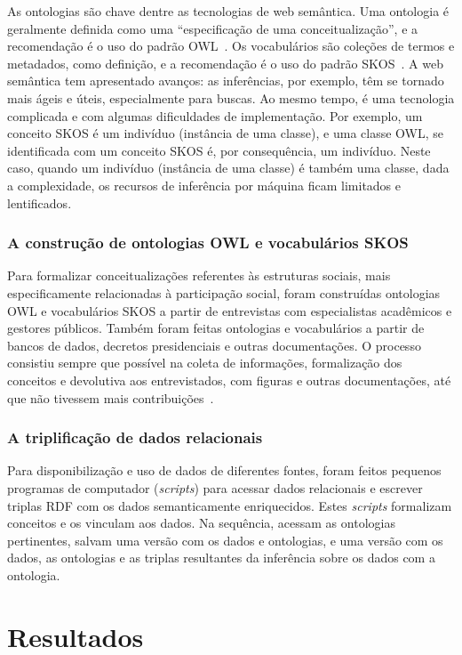 \documentclass[a4paper,openright,12pt]{report} %
\begin{document}
As ontologias são chave dentre as tecnologias de web semântica.
Uma ontologia é geralmente definida como uma ``especificação de
uma conceitualização'', e a recomendação é o uso do padrão OWL~\cite{owl}.
Os vocabulários são coleções de termos e metadados, como definição,
e a recomendação é o uso do padrão SKOS~\cite{skos}.
A web semântica tem apresentado avanços:
as inferências, por exemplo, têm se tornado mais ágeis e úteis, especialmente para buscas.
Ao mesmo tempo, é uma tecnologia
complicada e com algumas dificuldades de implementação.
Por exemplo, um conceito SKOS é um indivíduo (instância de uma classe),
e uma classe OWL,
se identificada com um conceito SKOS é, por consequência, um
indivíduo.
Neste caso, quando um indivíduo (instância de uma classe) é
também uma classe, dada a complexidade, os recursos de inferência por máquina 
ficam limitados e lentificados.

\subsection{A construção de ontologias OWL e vocabulários SKOS}

Para formalizar conceitualizações referentes às estruturas sociais,
mais especificamente relacionadas à participação social,
foram construídas ontologias OWL e vocabulários SKOS a partir de entrevistas
com especialistas acadêmicos e gestores públicos.
Também foram feitas ontologias e vocabulários a partir de bancos de dados,
decretos presidenciais e outras documentações.
O processo  consistiu sempre que possível na coleta de informações,
formalização dos conceitos e devolutiva aos entrevistados,
com figuras e outras documentações, até que não tivessem
mais contribuições~\cite{pnud5}.

\subsection{A triplificação de dados relacionais}
Para disponibilização e uso de dados de diferentes fontes, foram
feitos pequenos programas de computador (\emph{scripts}) para
acessar dados relacionais e escrever triplas RDF com os dados semanticamente enriquecidos.
Estes \emph{scripts} formalizam conceitos e os vinculam aos dados.
Na sequência, acessam as ontologias pertinentes, salvam
uma versão com os dados e ontologias, e uma versão
com os dados, as ontologias e as triplas resultantes da inferência sobre os dados com a ontologia.


\chapter{Resultados}\label{sec:res}
\end{document}
